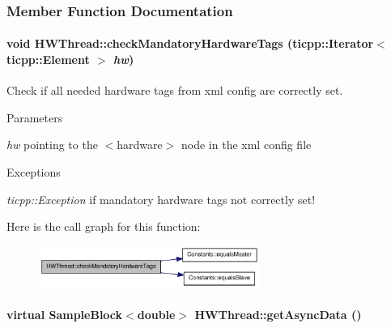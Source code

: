 \subsubsection{Member Function Documentation}
\hypertarget{class_h_w_thread_a89a9edf259a4538609b7f4c5be9db14d}{
\paragraph[{checkMandatoryHardwareTags}]{\setlength{\rightskip}{0pt plus 5cm}void HWThread::checkMandatoryHardwareTags (ticpp::Iterator$<$ ticpp::Element $>$ {\em hw})}\hfill}
\label{class_h_w_thread_a89a9edf259a4538609b7f4c5be9db14d}


Check if all needed hardware tags from xml config are correctly set. 
\begin{DoxyParams}{Parameters}
\item[{\em hw}]pointing to the $<$hardware$>$ node in the xml config file \end{DoxyParams}

\begin{DoxyExceptions}{Exceptions}
\item[{\em ticpp::Exception}]if mandatory hardware tags not correctly set! \end{DoxyExceptions}


Here is the call graph for this function:\nopagebreak
\begin{figure}[H]
\begin{center}
\leavevmode
\includegraphics[width=204pt]{class_h_w_thread_a89a9edf259a4538609b7f4c5be9db14d_cgraph}
\end{center}
\end{figure}
\hypertarget{class_h_w_thread_aa709526a915411a495a947f6bc6e06f9}{
\paragraph[{getAsyncData}]{\setlength{\rightskip}{0pt plus 5cm}virtual {\bf SampleBlock}$<$double$>$ HWThread::getAsyncData ()}\hfill}
\label{class_h_w_thread_aa709526a915411a495a947f6bc6e06f9}


